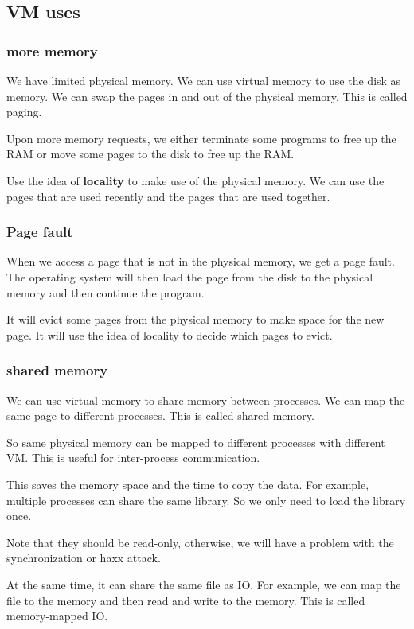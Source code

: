 \documentclass[letterpaper,12pt]{article}
\begin{document}
\subsection{VM uses}
\subsubsection{more memory}
We have limited physical memory. We can use virtual memory to use the disk as
memory. We can swap the pages in and out of the physical memory. This is called
paging.

Upon more memory requests, we either terminate some programs to free up the RAM
or move some pages to the disk to free up the RAM.

Use the idea of \textbf{locality} to make use of the physical memory. We can
use the pages that are used recently and the pages that are used together.

\subsubsection{Page fault}
When we access a page that is not in the physical memory, we get a page fault.
The operating system will then load the page from the disk to the physical
memory and then continue the program.

It will evict some pages from the physical memory to make space for the new
page. It will use the idea of locality to decide which pages to evict.

\subsubsection{shared memory}
We can use virtual memory to share memory between processes. We can map the
same page to different processes. This is called shared memory.

So same physical memory can be mapped to different processes with different VM.
This is useful for inter-process communication.

This saves the memory space and the time to copy the data. For example,
multiple processes can share the same library. So we only need to load the
library once.

Note that they should be read-only, otherwise, we will have a problem with the
synchronization or haxx attack.

At the same time, it can share the same file as IO. For example, we can map the
file to the memory and then read and write to the memory. This is called
memory-mapped IO.
\end{document}
